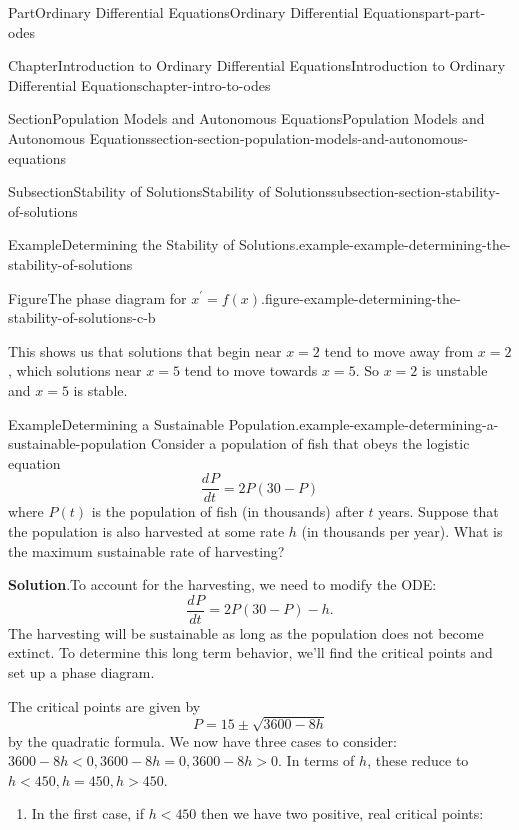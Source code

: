 \documentclass[twoside,10pt,]{book}
\newcommand{\blocktitlefont}{\relax}
\numberwithin{equation}{part}
\newcommand{\dv}[3][]{\dfrac{d^{#1} #2}{d #3^{#1}}}
\newcommand{\lt}{<}
\newcommand{\gt}{>}
\begin{document}
\begin{partptx}{Part}{Ordinary Differential Equations}{}{Ordinary Differential Equations}{}{}{part-part-odes}
\begin{chapterptx}{Chapter}{Introduction to Ordinary Differential Equations}{}{Introduction to Ordinary Differential Equations}{}{}{chapter-intro-to-odes}
\begin{sectionptx}{Section}{Population Models and Autonomous Equations}{}{Population Models and Autonomous Equations}{}{}{section-section-population-models-and-autonomous-equations}
\begin{subsectionptx}{Subsection}{Stability of Solutions}{}{Stability of Solutions}{}{}{subsection-section-stability-of-solutions}
\begin{example}{Example}{Determining the Stability of Solutions.}{example-example-determining-the-stability-of-solutions}
\begin{figureptx}{Figure}{The phase diagram for \(x^\prime = f(x).\)}{figure-example-determining-the-stability-of-solutions-c-b}{}
\begin{image}{0.25}{0.5}{0.25}{}
{
}%
\end{image}%
\tcblower
\end{figureptx}%
This shows us that solutions that begin near \(x = 2\) tend to move away from \(x = 2\), which solutions near \(x = 5\) tend to move towards \(x = 5\). So \(x = 2\) is unstable and \(x = 5\) is stable.%
\end{example}
\begin{example}{Example}{Determining a Sustainable Population.}{example-example-determining-a-sustainable-population}%
Consider a population of fish that obeys the logistic equation%
\begin{equation*}
\dv{P}{t} = 2P(30 - P)
\end{equation*}
where \(P(t)\) is the population of fish (in thousands) after \(t\) years. Suppose that the population is also harvested at some rate \(h\) (in thousands per year). What is the maximum sustainable rate of harvesting?%
\par\smallskip%
\noindent\textbf{\blocktitlefont Solution}.\hypertarget{solution-example-determining-a-sustainable-population-c}{}\quad{}To account for the harvesting, we need to modify the ODE:%
\begin{equation*}
\dv{P}{t} = 2P(30 - P) - h.
\end{equation*}
The harvesting will be sustainable as long as the population does not become extinct. To determine this long term behavior, we'll find the critical points and set up a phase diagram.%
\par
The critical points are given by%
\begin{equation*}
P = 15 \pm \sqrt{3600 - 8h}
\end{equation*}
by the quadratic formula. We now have three cases to consider: \(3600 - 8h \lt 0, 3600 - 8h = 0, 3600 - 8h \gt 0.\) In terms of \(h\), these reduce to \(h \lt 450, h = 450, h \gt 450\).%
%
\begin{enumerate}
\item{}In the first case, if \(h \lt 450\) then we have two positive, real critical points:%
\begin{equation*}

\end{equation*}
\end{enumerate}
\end{example}
\end{subsectionptx}
\end{sectionptx}
\end{chapterptx}
\end{partptx}
\end{document}

